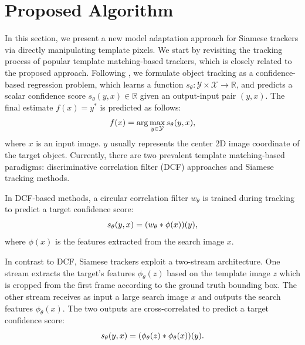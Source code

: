 \documentclass[journal]{IEEEtran}
\begin{document}
\section{Proposed Algorithm}
In this section, we present a new model adaptation approach for Siamese trackers via directly manipulating template pixels. We start by revisiting the tracking process of popular template matching-based trackers, which is closely related to the proposed approach. Following \cite{Danelljan_2020_CVPR}, we formulate object tracking as a confidence-based regression problem, which learns a function $s_\theta:\mathcal{Y\times X\rightarrow \mathbb R}$, and predicts a scalar confidence score $s_\theta(y,x)\in\mathbb R$ given an output-input pair $(y,x)$. The final estimate $f(x)=y^*$ is predicted as follows:
\vspace{-0.1cm}
\begin{equation}
    f(x) = \arg\max_{y\in \mathcal Y}s_\theta (y,x),
    \vspace{-0.1cm}
\end{equation}
where $x$ is an input image. $y$ usually represents the center 2D image coordinate of the target object. Currently, there are two prevalent template matching-based paradigms: discriminative correlation filter (DCF) approaches and Siamese tracking methods.

In DCF-based methods, a circular correlation filter $w_{\theta}$ is trained during tracking to predict a target confidence score:
\vspace{-0.1cm}
\begin{equation}
    s_\theta(y,x)=(w_\theta * \phi(x))(y),
    \vspace{-0.1cm}
    \label{equ:dcf}
\end{equation}
where $\phi(x)$ is the features extracted from the search image $x$.

In contrast to DCF, Siamese trackers exploit a two-stream architecture. One stream extracts the target’s features $\phi_\theta(z)$ based on the template image $z$ which is cropped from the first frame according to the ground truth bounding box. The other stream receives as input a large search image $x$ and outputs the search features $\phi_\theta(x)$. The two outputs are cross-correlated to predict a target confidence score:
\vspace{-0.1cm}
\begin{equation}
    s_\theta(y,x)=(\phi_\theta(z) * \phi_\theta(x))(y).
    \vspace{-0.1cm}
    \label{equ:siamese}
\end{equation}
\end{document}
